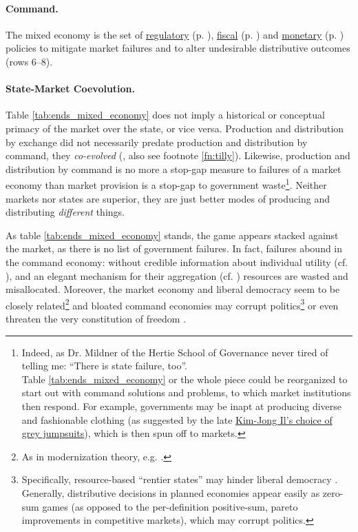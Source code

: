 \paragraph[Command]{Command.}  \label{sec:command} The mixed economy is the set of \hyperref[sec:regulatory]{regulatory} (p. \pageref{sec:regulatory}), \hyperref[sec:fiscal]{fiscal} (p. \pageref{sec:fiscal}) and \hyperref[sec:monetary]{monetary} (p. \pageref{sec:monetary}) policies to mitigate market failures and to alter undesirable distributive outcomes (rows 6--8).

\paragraph{State-Market Coevolution.} Table \ref{tab:ends_mixed_economy} does not imply a historical or conceptual primacy of the market over the state, or vice versa. Production and distribution by exchange did not necessarily predate production and distribution by command, they \emph{co-evolved} (\citealt{Tilly-1985-aa}, also see footnote \ref{fn:tilly}). Likewise, production and distribution by command is no more a stop-gap measure to failures of a market economy than market provision is a stop-gap to government waste\footnote
	{Indeed, as Dr. Mildner of the Hertie School of Governance never tired of telling me: ``There is state failure, too''. \\
	Table \ref{tab:ends_mixed_economy} or the whole piece could be reorganized to start out with command solutions and problems, to which market institutions then respond. For example, governments may be inapt at producing diverse and fashionable clothing (as suggested by the late \href{http://kimjongillookingatthings.tumblr.com/}{Kim-Jong Il's choice of grey jumpsuits}), which is then spun off to markets.}. 
Neither markets nor states are superior, they are just better modes of producing and distributing \emph{different} things.

As table \ref{tab:ends_mixed_economy} stands, the game appears stacked against the market, as there is no list of government failures. In fact, failures abound in the command economy: without credible information about individual utility (cf. \citealt{Hayek1931}), and an elegant mechanism for their aggregation (cf. \citealt{Lerner1944, Lange1934, Debreu1954}) resources are wasted and misallocated. Moreover, the market economy and liberal democracy seem to be closely related\footnote{
	As in modernization theory, e.g. \cite{InglehartWelzel-2005-aa}.} 
and bloated command economies may corrupt politics\footnote{
	Specifically, resource-based ``rentier states'' may hinder liberal democracy \citep{Beblawi1990}. Generally, distributive decisions in planned economies appear easily as zero-sum games (as opposed to the per-definition positive-sum, pareto improvements in competitive markets), which may corrupt politics.} 
or even threaten the very constitution of freedom \citep{Hayek1944, Friedman1962}.

